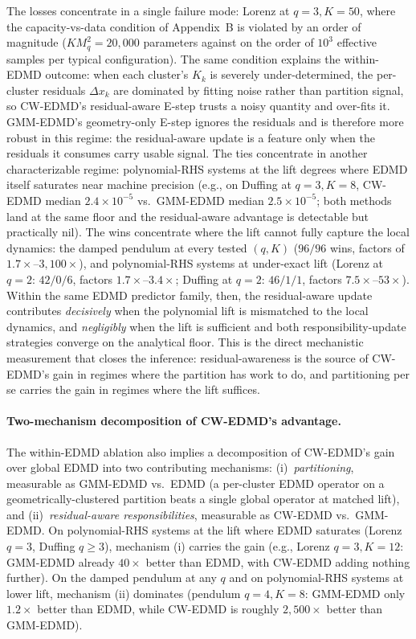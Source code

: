\documentclass{article}
\begin{document}
The losses concentrate in a single failure mode: Lorenz at $q{=}3, K{=}50$, where the capacity-vs-data condition of Appendix~B is violated by an order of magnitude ($K M_q^2 = 20{,}000$ parameters against on the order of $10^3$ effective samples per typical configuration). The same condition explains the within-EDMD outcome: when each cluster's $K_k$ is severely under-determined, the per-cluster residuals $\Delta x_k$ are dominated by fitting noise rather than partition signal, so CW-EDMD's residual-aware E-step trusts a noisy quantity and over-fits it. GMM-EDMD's geometry-only E-step ignores the residuals and is therefore more robust in this regime: the residual-aware update is a feature only when the residuals it consumes carry usable signal. The ties concentrate in another characterizable regime: polynomial-RHS systems at the lift degrees where EDMD itself saturates near machine precision (e.g., on Duffing at $q{=}3, K{=}8$, CW-EDMD median $2.4{\times}10^{-5}$ vs.\ GMM-EDMD median $2.5{\times}10^{-5}$; both methods land at the same floor and the residual-aware advantage is detectable but practically nil). The wins concentrate where the lift cannot fully capture the local dynamics: the damped pendulum at every tested $(q, K)$ ($96/96$ wins, factors of $1.7\times$--$3{,}100\times$), and polynomial-RHS systems at under-exact lift (Lorenz at $q{=}2$: $42/0/6$, factors $1.7\times$--$3.4\times$; Duffing at $q{=}2$: $46/1/1$, factors $7.5\times$--$53\times$). Within the same EDMD predictor family, then, the residual-aware update contributes \emph{decisively} when the polynomial lift is mismatched to the local dynamics, and \emph{negligibly} when the lift is sufficient and both responsibility-update strategies converge on the analytical floor. This is the direct mechanistic measurement that closes the inference: residual-awareness is the source of CW-EDMD's gain in regimes where the partition has work to do, and partitioning per se carries the gain in regimes where the lift suffices.

\paragraph{Two-mechanism decomposition of CW-EDMD's advantage.} The within-EDMD ablation also implies a decomposition of CW-EDMD's gain over global EDMD into two contributing mechanisms: (i)~\emph{partitioning}, measurable as GMM-EDMD vs.\ EDMD (a per-cluster EDMD operator on a geometrically-clustered partition beats a single global operator at matched lift), and (ii)~\emph{residual-aware responsibilities}, measurable as CW-EDMD vs.\ GMM-EDMD. On polynomial-RHS systems at the lift where EDMD saturates (Lorenz $q{=}3$, Duffing $q{\geq}3$), mechanism (i) carries the gain (e.g., Lorenz $q{=}3, K{=}12$: GMM-EDMD already $40\times$ better than EDMD, with CW-EDMD adding nothing further). On the damped pendulum at any $q$ and on polynomial-RHS systems at lower lift, mechanism (ii) dominates (pendulum $q{=}4, K{=}8$: GMM-EDMD only $1.2\times$ better than EDMD, while CW-EDMD is roughly $2{,}500\times$ better than GMM-EDMD).
\end{document}
